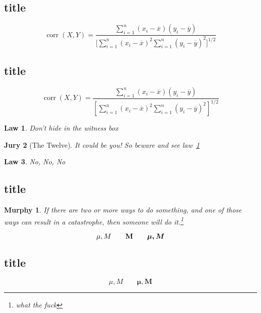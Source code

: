 \documentclass[UTF8]{ctexart}
\newtheorem{law}{Law}
\newtheorem{jury}[law]{Jury}
\newtheorem{mur}{Murphy}[subsection]
\begin{document}
\subsection{title}
\begin{displaymath}
\mathop{\mathrm{corr}}(X,Y)=
\frac{\displaystyle
	\sum_{i=1}^n(x_i-\overline x)
	(y_i-\overline y)}
{\displaystyle\biggl[
	\sum_{i=1}^n(x_i-\overline x)^2
	\sum_{i=1}^n(y_i-\overline y)^2
	\biggr]^{1/2}}
\end{displaymath}


\subsection{title}
\begin{displaymath}
\mathop{\mathrm{corr}}(X,Y)=
\frac{\displaystyle
	\sum_{i=1}^n(x_i-\overline x)
	(y_i-\overline y)}
{\displaystyle\left[
	\sum_{i=1}^n(x_i-\overline x)^2
	\sum_{i=1}^n(y_i-\overline y)^2
	\right]^{1/2}}
\end{displaymath}

\begin{law} \label{law:box}
	Don’t hide in the witness box
\end{law}
\begin{jury}[The Twelve]
	It could be you! So beware and
	see law~\ref{law:box}\end{jury}
\begin{law}No, No, No\end{law}
\subsection{title}

\begin{mur}
	If there are two or more
	ways to do something, and
	one of those ways can result
	in a catastrophe, then
	someone will do it.\footnote{what the fuck}
\end{mur}

\begin{displaymath}
\mu, M \qquad \mathbf{M} \qquad
\mbox{\boldmath $\mu, M$}
\end{displaymath}

\subsection{title}
\begin{displaymath}
\mu, M \qquad
\boldsymbol{\mu}, \boldsymbol{M}
\end{displaymath}
\end{document}
